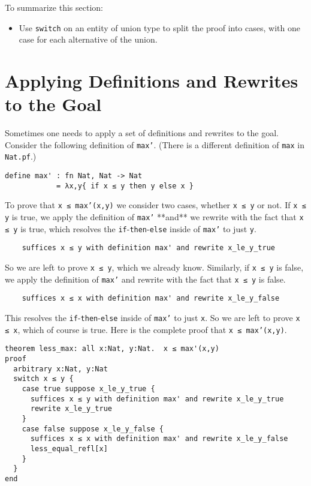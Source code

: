 \documentclass[12pt]{article}
\begin{document}
To summarize this section:
\begin{itemize}
\item Use \texttt{switch} on an entity of union type to split the
  proof into cases, with one case for each alternative of the union.
\end{itemize}

\pagebreak

\section{Applying Definitions and Rewrites to the Goal}

Sometimes one needs to apply a set of definitions and rewrites
to the goal. Consider the following definition of \texttt{max'}.
(There is a different definition of \texttt{max} in \texttt{Nat.pf}.)

\begin{verbatim}
define max' : fn Nat, Nat -> Nat
            = λx,y{ if x ≤ y then y else x }
\end{verbatim}

To prove that \texttt{x ≤ max'(x,y)} we consider two cases, whether
\texttt{x ≤ y} or not. If \texttt{x ≤ y} is true, we apply the
definition of \texttt{max'} **and** we rewrite with the fact that
\texttt{x ≤ y} is true, which resolves the
\texttt{if}-\texttt{then}-\texttt{else} inside of \texttt{max'} to
just \texttt{y}.

\begin{verbatim}
    suffices x ≤ y with definition max' and rewrite x_le_y_true
\end{verbatim}

\noindent So we are left to prove \texttt{x ≤ y}, which we already
know.  Similarly, if \texttt{x ≤ y} is false, we apply the definition
of \texttt{max'} and rewrite with the fact that \texttt{x ≤ y} is
false.

\begin{verbatim}
    suffices x ≤ x with definition max' and rewrite x_le_y_false
\end{verbatim}

\noindent This resolves the \texttt{if}-\texttt{then}-\texttt{else}
inside of \texttt{max'} to just \texttt{x}. So we are left to prove
\texttt{x ≤ x}, which of course is true.  Here is the complete proof
that \texttt{x ≤ max'(x,y)}.

\begin{verbatim}
theorem less_max: all x:Nat, y:Nat.  x ≤ max'(x,y)
proof
  arbitrary x:Nat, y:Nat
  switch x ≤ y {
    case true suppose x_le_y_true {
      suffices x ≤ y with definition max' and rewrite x_le_y_true
      rewrite x_le_y_true
    }
    case false suppose x_le_y_false {
      suffices x ≤ x with definition max' and rewrite x_le_y_false
      less_equal_refl[x]
    }
  }
end
\end{verbatim}
\end{document}
